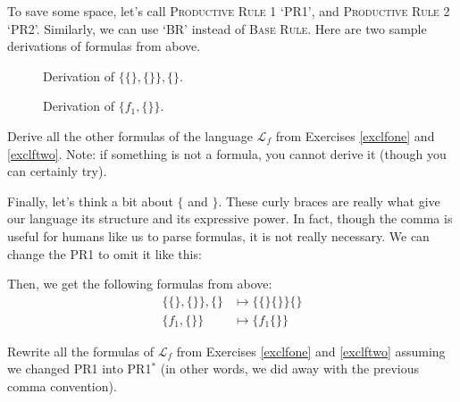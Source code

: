 To save some space, let's call \textsc{Productive Rule 1} `\textsc{PR1}', and \textsc{Productive Rule 2} `\textsc{PR2}'. Similarly, we can use `\textsc{BR}' instead of \textsc{Base Rule}. Here are two sample derivations of formulas from above.

\begin{figure}[h]
	\centering
	\begin{axiomatic}
	\end{axiomatic}
	\caption{Derivation of $\{\{\}, \{\}\}, \{\}$.}
\end{figure}

\begin{figure}[h]
	\centering
\begin{axiomatic}
	\nl{$f_1$}{BR}
	\nl{$\{\}$}{BR}
	\nl{$f_1, \{\}$}{PR1: 1, 2}
	\nl{$\{f_1, \{\}\}$}{PR2: 3}
\end{axiomatic}
\caption{Derivation of $\{f_1, \{\}\}$.}
\end{figure}

\begin{exc}
Derive all the other formulas of the language $\mathcal{L}_f$ from Exercises \ref{exclfone} and \ref{exclftwo}. Note: if something is not a formula, you cannot derive it (though you can certainly try).
\end{exc}

Finally, let's think a bit about $\{$ and $\}$. These curly braces are really what give our language its structure and its expressive power. In fact, though the comma is useful for humans like us to parse formulas, it is not really necessary. We can change the \textsc{PR1} to omit it like this:


Then, we get the following formulas from above:
\begin{align*}
	\{\{\}, \{\}\}, \{\} &\mapsto \{\{\}\{\}\}\{\}\\
	\{f_1, \{\}\} &\mapsto \{f_1\{\}\}
\end{align*}

\begin{exc}
Rewrite all the formulas of $\mathcal{L}_f$ from Exercises \ref{exclfone} and \ref{exclftwo} assuming we changed \textsc{PR1} into \textsc{PR1}$^*$ (in other words, we did away with the previous comma convention).
\end{exc}


